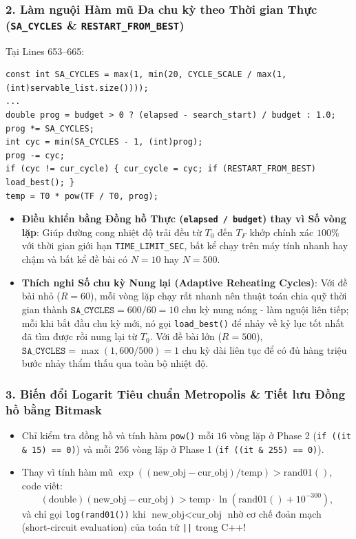 \documentclass[11pt,a4paper]{article}
\theoremstyle{definition}
\begin{document}
\subsubsection{2. Làm nguội Hàm mũ Đa chu kỳ theo Thời gian Thực (\texttt{SA\_CYCLES} \& \texttt{RESTART\_FROM\_BEST})}
Tại Lines 653--665:
\begin{lstlisting}
const int SA_CYCLES = max(1, min(20, CYCLE_SCALE / max(1, (int)servable_list.size())));
...
double prog = budget > 0 ? (elapsed - search_start) / budget : 1.0;
prog *= SA_CYCLES;
int cyc = min(SA_CYCLES - 1, (int)prog);
prog -= cyc;
if (cyc != cur_cycle) { cur_cycle = cyc; if (RESTART_FROM_BEST) load_best(); }
temp = T0 * pow(TF / T0, prog);
\end{lstlisting}
\begin{itemize}[leftmargin=1.5em]
    \item \textbf{Điều khiển bằng Đồng hồ Thực (\texttt{elapsed / budget}) thay vì Số vòng lặp}: Giúp đường cong nhiệt độ trải đều từ $T_0$ đến $T_F$ khớp chính xác $100\%$ với thời gian giới hạn \texttt{TIME\_LIMIT\_SEC}, bất kể chạy trên máy tính nhanh hay chậm và bất kể đề bài có $N = 10$ hay $N = 500$.
    \item \textbf{Thích nghi Số chu kỳ Nung lại (Adaptive Reheating Cycles)}: Với đề bài nhỏ ($R = 60$), mỗi vòng lặp chạy rất nhanh nên thuật toán chia quỹ thời gian thành $\texttt{SA\_CYCLES} = 600 / 60 = 10$ chu kỳ nung nóng - làm nguội liên tiếp; mỗi khi bắt đầu chu kỳ mới, nó gọi \texttt{load\_best()} để nhảy về kỷ lục tốt nhất đã tìm được rồi nung lại từ $T_0$. Với đề bài lớn ($R = 500$), $\texttt{SA\_CYCLES} = \max(1, 600/500) = 1$ chu kỳ dài liên tục để có đủ hàng triệu bước nhảy thẩm thấu qua toàn bộ nhiệt độ.
\end{itemize}

\subsubsection{3. Biến đổi Logarit Tiêu chuẩn Metropolis \& Tiết lưu Đồng hồ bằng Bitmask}
\begin{itemize}[leftmargin=1.5em]
    \item Chỉ kiểm tra đồng hồ và tính hàm \texttt{pow()} mỗi $16$ vòng lặp ở Phase 2 (\texttt{if ((it \& 15) == 0)}) và mỗi $256$ vòng lặp ở Phase 1 (\texttt{if ((it \& 255) == 0)}).
    \item Thay vì tính hàm mũ $\exp((\text{new\_obj} - \text{cur\_obj}) / \text{temp}) > \text{rand01}()$, code viết:
    \[
        (\text{double})(\text{new\_obj} - \text{cur\_obj}) > \text{temp} \cdot \ln(\text{rand01}() + 10^{-300}),
    \]
    và chỉ gọi \texttt{log(rand01())} khi $\text{new\_obj} < \text{cur\_obj}$ nhờ cơ chế đoản mạch (short-circuit evaluation) của toán tử \texttt{||} trong C++!
\end{itemize}
\end{document}
